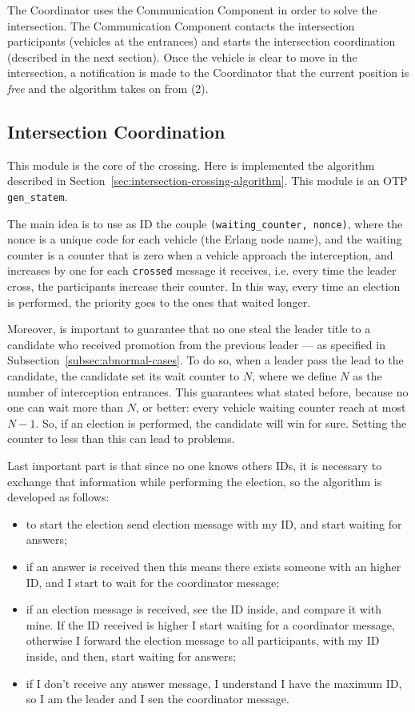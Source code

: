 \documentclass{memoir}
\begin{document}
The Coordinator uses the Communication Component in order to solve the intersection. The Communication Component contacts the intersection participants (vehicles at the entrances) and starts the intersection coordination (described in the next section). Once the vehicle is clear to move in the intersection, a notification is made to the Coordinator that the current position is \textit{free} and the algorithm takes on from (2).

\subsection{Intersection Coordination}
This module is the core of the crossing. Here is implemented the algorithm described in Section~\ref{sec:intersection-crossing-algorithm}. This module is an OTP \verb|gen_statem|.

The main idea is to use as ID the couple \verb|(waiting_counter, nonce)|, where the nonce is a unique code for each vehicle (the Erlang node name), and the waiting counter is a counter that is zero when a vehicle approach the interception, and increases by one for each \verb|crossed| message it receives, i.e. every time the leader cross, the participants increase their counter. In this way, every time an election is performed, the priority goes to the ones that waited longer. 

Moreover, is important to guarantee that no one steal the leader title to a candidate who received promotion from the previous leader --- as specified in Subsection~\ref{subsec:abnormal-cases}. To do so, when a leader pass the lead to the candidate, the candidate set its wait counter to $N$, where we define $N$ as the number of interception entrances. This guarantees what stated before, because no one can wait more than $N$, or better: every vehicle waiting counter reach at most $N - 1$. So, if an election is performed, the candidate will win for sure. Setting the counter to less than this can lead to problems.

Last important part is that since no one knows others IDs, it is necessary to exchange that information while performing the election, so the algorithm is developed as follows:

\begin{itemize}
	\item to start the election send election message with my ID, and start waiting for answers;
	\item if an answer is received then this means there exists someone with an higher ID, and I start to wait for the coordinator message;
	\item if an election message is received, see the ID inside, and compare it with mine. If the ID received is higher I start waiting for a coordinator message, otherwise I forward the election message to all participants, with my ID inside, and then, start waiting for answers;
	\item if I don't receive any answer message, I understand I have the maximum ID, so I am the leader and I sen the coordinator message.
\end{itemize}
\end{document}
